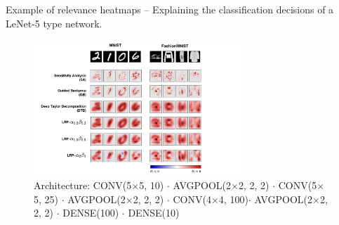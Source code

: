 \documentclass[Nike]{tuberlinbeamer}
\begin{document}
\begin{frame}{Example of relevance heatmaps}
-- Explaining the classification decisions of a LeNet-5 type network.
				\begin{figure}[h]
					\includegraphics [width=0.7\textwidth]{figures/present_lenet_heatmaps}
					\caption{ \tiny
					Architecture: 
								CONV(5$\times$5, 10) $\cdot$ AVGPOOL(2$\times$2, 2, 2) $\cdot$ 
								CONV(5$\times$5, 25) $\cdot$ 
								AVGPOOL(2$\times$2, 2, 2) $\cdot$
								CONV(4$\times$4, 100)$\cdot$
								AVGPOOL(2$\times$2, 2, 2) $\cdot$
								DENSE(100) $\cdot$ DENSE(10)
					}
				\end{figure}

\end{frame}
\end{document}
